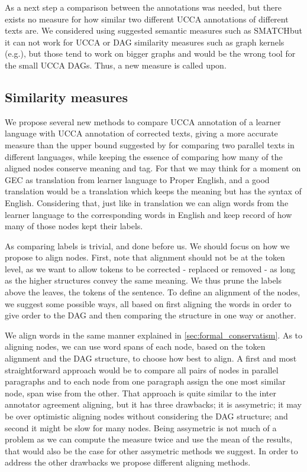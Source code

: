 \documentclass[english]{article}
\begin{document}
{As a next step a comparison between the annotations was needed, but
there exists no measure for how similar two different UCCA annotations
of different texts are. We considered using suggested semantic measures
such as SMATCH\cite{cai2013smatch}but it can not work for UCCA or
DAG similarity measures such as graph kernels (e.g.\cite{kashima2003marginalized}),
but those tend to work on bigger graphs and would be the wrong tool
for the small UCCA DAGs. Thus, a new measure is called upon.

\subsection{Similarity measures\label{subsec:Similarity-measures}}

We propose several new methods to compare UCCA annotation of a learner\\
language with UCCA annotation of corrected texts, giving a more accurate
measure than the upper bound suggested by \cite{sulem2015conceptual}for
comparing two parallel texts in different languages, while keeping
the essence of comparing how many of the aligned nodes conserve meaning
and tag. For that we may think for a moment on GEC as
translation from learner language to Proper English, and a good translation
would be a translation which keeps the meaning but has the syntax
of English. Considering that, just like in translation we can align
words from the learner language to the corresponding words in English
and keep record of how many of those nodes kept their labels.

As comparing labels is trivial, and done before us. We should focus on how we propose to
align nodes. First, note that alignment should not be at
the token level, as we want to allow tokens to be corrected - replaced or removed -
as long as the higher structures convey the same meaning. We thus
prune the labels above the leaves, the tokens of the sentence. To
define an alignment of the nodes, we suggest some possible ways, all
based on first aligning the words in order to give order to the DAG
and then comparing the structure in one way or another.

We align words in the same manner explained in \ref{sec:formal_conservatism}. As to aligning nodes, we can use word spans of each node, based on
the token alignment and the DAG structure, to choose how best to align.
A first and most straightforward approach would be to compare all
pairs of nodes in parallel paragraphs and to each node from one paragraph
assign the one most similar node, span wise from the other. That approach
is quite similar to the inter annotator agreement aligning, but it
has three drawbacks; it is assymetric; it may be over optimistic aligning
nodes without considering the DAG structure; and second it might be
slow for many nodes. Being assymetric is not much of a problem as
we can compute the measure twice and use the mean of the results,
that would also be the case for other assymetric methods we suggest.
In order to address the other drawbacks we propose different aligning
methods.

}
\end{document}
